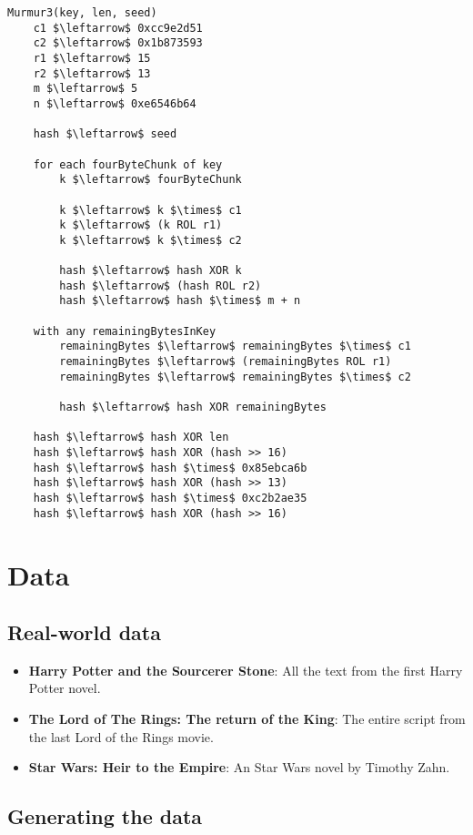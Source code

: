 \documentclass[12pt]{article}
\begin{document}
\begin{lstlisting}[mathescape=true]
Murmur3(key, len, seed)
    c1 $\leftarrow$ 0xcc9e2d51
    c2 $\leftarrow$ 0x1b873593
    r1 $\leftarrow$ 15
    r2 $\leftarrow$ 13
    m $\leftarrow$ 5
    n $\leftarrow$ 0xe6546b64
 
    hash $\leftarrow$ seed

    for each fourByteChunk of key
        k $\leftarrow$ fourByteChunk

        k $\leftarrow$ k $\times$ c1
        k $\leftarrow$ (k ROL r1)
        k $\leftarrow$ k $\times$ c2

        hash $\leftarrow$ hash XOR k
        hash $\leftarrow$ (hash ROL r2)
        hash $\leftarrow$ hash $\times$ m + n

    with any remainingBytesInKey
        remainingBytes $\leftarrow$ remainingBytes $\times$ c1
        remainingBytes $\leftarrow$ (remainingBytes ROL r1)
        remainingBytes $\leftarrow$ remainingBytes $\times$ c2

        hash $\leftarrow$ hash XOR remainingBytes
 
    hash $\leftarrow$ hash XOR len
    hash $\leftarrow$ hash XOR (hash >> 16)
    hash $\leftarrow$ hash $\times$ 0x85ebca6b
    hash $\leftarrow$ hash XOR (hash >> 13)
    hash $\leftarrow$ hash $\times$ 0xc2b2ae35
    hash $\leftarrow$ hash XOR (hash >> 16)

\end{lstlisting}

\section{Data} %

\subsection{Real-world data}
\begin{itemize}
\item \textbf{Harry Potter and the Sourcerer Stone}: All the text from the first Harry Potter novel.
\item \textbf{The Lord of The Rings: The return of the King}: The entire script from the last Lord of the Rings movie.
\item \textbf{Star Wars: Heir to the Empire}:  An Star Wars novel by Timothy Zahn. 
\end{itemize}

\subsection{Generating the data}
\end{document}
